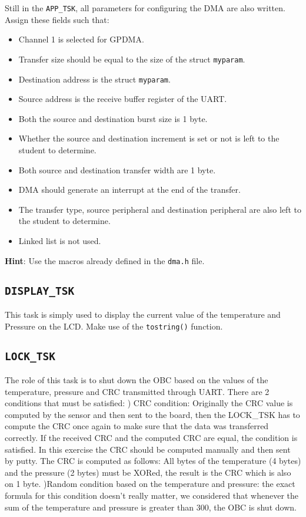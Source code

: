 \documentclass[a4paper]{article}
\begin{document}
Still in the \texttt{APP\_TSK}, all parameters for configuring the DMA are also written. Assign these fields such that:
\begin{itemize}
    \item Channel 1 is selected for GPDMA.
    \item Transfer size should be equal to the size of the struct \texttt{myparam}.
    \item Destination address is the struct \texttt{myparam}.
    \item Source address is the receive buffer register of the UART.
    \item Both the source and destination burst size is 1 byte.
    \item Whether the source and destination increment is set or not is left to the student to determine.
    \item Both source and destination transfer width are 1 byte.
    \item DMA should generate an interrupt at the end of the transfer.
    \item The transfer type, source peripheral and destination peripheral are also left to the student to determine.
    \item Linked list is not used.
\end{itemize}
\textbf{Hint}: Use the macros already defined in the \texttt{dma.h} file.


\subsection{\texttt{DISPLAY\_TSK}}
This task is simply used to display the current value of the temperature and Pressure on the LCD.
Make use of the \texttt{tostring()} function.
\subsection{\texttt{LOCK\_TSK}}
The role of this task is to shut down the OBC based on the values of
the temperature, pressure and CRC transmitted through UART.
There are 2 conditions that must be satisfied: ) CRC condition: Originally the CRC value is computed by the sensor
and then sent to the board, then the LOCK\_TSK has to compute the CRC once again
to make sure that the data was transferred correctly. If the received CRC and the computed CRC 
are equal, the condition is satisfied. In this exercise
the CRC should be computed manually and then sent by putty. The CRC is computed as follows: All bytes of the
temperature (4 bytes) and the pressure (2 bytes) must be XORed, the result is the CRC which is also on 1 byte. )Random condition based on the temperature and pressure: the exact formula for this condition doesn't really matter,
we considered that whenever the sum of the temperature and pressure is greater than 300, the OBC is shut down.
\end{document}
